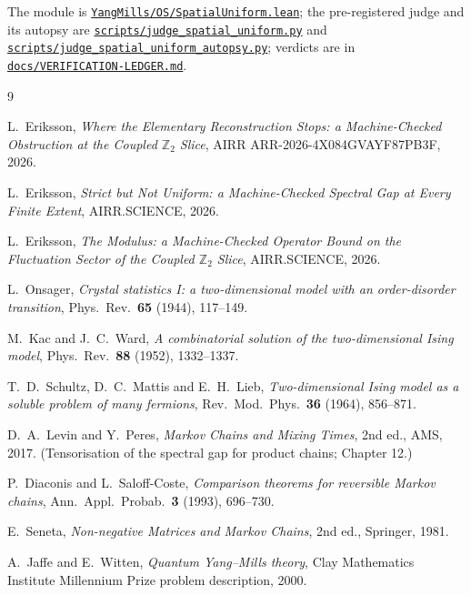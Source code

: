 \documentclass[11pt]{article}
\theoremstyle{definition}
\newcommand{\anchor}{247de2b31c8b2b6edb2cffe5fd6d96d6aa5c8a7a}
\newcommand{\repofile}[2]{%
  \href{https://github.com/lluiseriksson/THE-ERIKSSON-PROGRAMME/blob/\anchor/#1}{\nolinkurl{#2}}}
\newcommand{\Z}{\mathbb{Z}}
\begin{document}
The module is
\repofile{YangMills/OS/SpatialUniform.lean}{YangMills/OS/SpatialUniform.lean};
the pre-registered judge and its autopsy are
\repofile{scripts/judge\_spatial\_uniform.py}{scripts/judge\_spatial\_uniform.py}
and
\repofile{scripts/judge\_spatial\_uniform\_autopsy.py}{scripts/judge\_spatial\_uniform\_autopsy.py};
verdicts are in
\repofile{docs/VERIFICATION-LEDGER.md}{docs/VERIFICATION-LEDGER.md}.

\begin{thebibliography}{9}

L.~Eriksson,
\emph{Where the Elementary Reconstruction Stops: a Machine-Checked Obstruction
at the Coupled $\Z_2$ Slice}, AIRR ARR-2026-4X084GVAYF87PB3F, 2026.

L.~Eriksson,
\emph{Strict but Not Uniform: a Machine-Checked Spectral Gap at Every Finite
Extent}, AIRR.SCIENCE, 2026.

L.~Eriksson,
\emph{The Modulus: a Machine-Checked Operator Bound on the Fluctuation Sector of
the Coupled $\Z_2$ Slice}, AIRR.SCIENCE, 2026.

L.~Onsager,
\emph{Crystal statistics I: a two-dimensional model with an order-disorder
transition}, Phys.\ Rev.\ \textbf{65} (1944), 117--149.

M.~Kac and J.~C.~Ward,
\emph{A combinatorial solution of the two-dimensional Ising model},
Phys.\ Rev.\ \textbf{88} (1952), 1332--1337.

T.~D.~Schultz, D.~C.~Mattis and E.~H.~Lieb,
\emph{Two-dimensional Ising model as a soluble problem of many fermions},
Rev.\ Mod.\ Phys.\ \textbf{36} (1964), 856--871.

D.~A.~Levin and Y.~Peres,
\emph{Markov Chains and Mixing Times}, 2nd ed., AMS, 2017.
(Tensorisation of the spectral gap for product chains; Chapter 12.)

P.~Diaconis and L.~Saloff-Coste,
\emph{Comparison theorems for reversible Markov chains},
Ann.\ Appl.\ Probab.\ \textbf{3} (1993), 696--730.

E.~Seneta,
\emph{Non-negative Matrices and Markov Chains}, 2nd ed., Springer, 1981.

A.~Jaffe and E.~Witten,
\emph{Quantum Yang--Mills theory}, Clay Mathematics Institute Millennium Prize
problem description, 2000.

\end{thebibliography}
\end{document}
